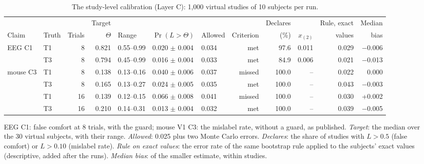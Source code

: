\documentclass[11pt]{article}
\newcommand{\tablenote}[1]{\par\smallskip\noindent
  \begin{minipage}{\linewidth}\footnotesize\setlength{\parindent}{0pt}#1\end{minipage}}
\begin{document}
\begin{table}[!htb]
\centering\scriptsize
\caption{The study-level calibration (Layer C): 1{,}000 virtual studies of 10 subjects per run.}
\setlength{\tabcolsep}{3pt}
\begin{tabular}{llrrlllrrrrr}
\toprule
 & & & Target & & & & & Declares & & Rule, exact & Median \\
Claim & Truth & Trials & $\Theta$ & Range & $\Pr(L>\Theta)$ & Allowed & Criterion & (\%) & $x_{(2)}$ & values & bias \\
\midrule
EEG C1 & T1 & 8 & 0.821 & 0.55--0.99 & 0.020 $\pm$ 0.004 & 0.034 & met & 97.6 & 0.011 & 0.029 & $-$0.006 \\
 & T3 & 8 & 0.794 & 0.45--0.99 & 0.016 $\pm$ 0.004 & 0.033 & met & 84.9 & 0.006 & 0.021 & $-$0.013 \\
\addlinespace
mouse C3 & T1 & 8 & 0.138 & 0.13--0.16 & 0.040 $\pm$ 0.006 & 0.037 & missed & 100.0 & -- & 0.022 & 0.000 \\
 & T3 & 8 & 0.165 & 0.13--0.27 & 0.024 $\pm$ 0.005 & 0.035 & met & 100.0 & -- & 0.043 & $-$0.003 \\
 & T1 & 16 & 0.139 & 0.12--0.15 & 0.066 $\pm$ 0.008 & 0.041 & missed & 100.0 & -- & 0.030 & +0.002 \\
 & T3 & 16 & 0.210 & 0.14--0.31 & 0.013 $\pm$ 0.004 & 0.032 & met & 100.0 & -- & 0.039 & $-$0.005 \\
\bottomrule
\end{tabular}
\tablenote{EEG C1: false comfort at 8 trials, with the guard; mouse V1 C3: the mislabel rate, without a guard, as published.
\emph{Target}: the median over the 30 virtual subjects, with their range.
\emph{Allowed}: 0.025 plus two Monte Carlo errors.
\emph{Declares}: the share of studies with $L>0.5$ (false comfort) or $L>0.10$ (mislabel rate).
\emph{Rule on exact values}: the error rate of the same bootstrap rule applied to the subjects' exact values (descriptive, added after the runs).
\emph{Median bias}: of the smaller estimate, within studies.}
\end{table}
\end{document}
